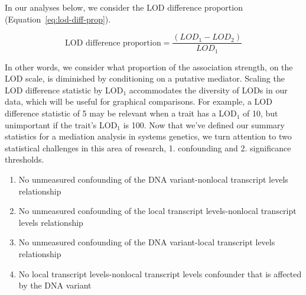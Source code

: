 \documentclass[oneside]{book}\usepackage[]{graphicx}\usepackage[]{color}
\newenvironment{frameenv}[1]
    {\begin{myfloat}[tb]
    \begin{mdframed}[roundcorner=10pt,backgroundcolor=blue!10]
    \caption{#1}
    }
    {%
    \end{mdframed}\end{myfloat}
    }
\begin{document}
\begin{titlepage}
In our analyses below, we consider the LOD difference
proportion (Equation~\ref{eq:lod-diff-prop}).

\begin{equation}
\text{LOD difference proportion} = \frac{(LOD_1 - LOD_2)}{LOD_1}
\label{eq:lod-diff-prop}
\end{equation}

In other words, we consider what proportion of the association strength, on the LOD scale, is diminished by conditioning on a putative mediator.
Scaling the LOD difference statistic by LOD$_1$ accommodates the diversity of LODs in our data, which will be useful for graphical comparisons.
For example, a LOD difference statistic of 5 may be relevant when
a trait has a LOD$_1$ of 10, but unimportant if the trait's LOD$_1$ is 100. Now that we've defined our summary statistics for a mediation analysis in systems genetics, we turn attention to two statistical challenges in this area of research, 1. confounding and 2. significance thresholds.












\begin{frameenv}{Four assumptions for causal inference}\label{frame1}
  \begin{enumerate}
\item No unmeasured confounding of the DNA variant-nonlocal transcript levels relationship
\item No unmeasured confounding of the local transcript levels-nonlocal transcript levels relationship
\item No unmeasured confounding of the DNA variant-local transcript levels relationship
\item No local transcript levels-nonlocal transcript levels confounder that is affected by the DNA variant
\end{enumerate}

\end{frameenv}



\end{titlepage}
\end{document}
